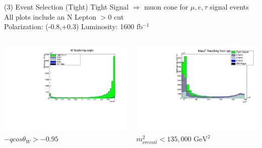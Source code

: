 \documentclass[10pt]{beamer}
\begin{document}
\begin{frame}{(3) Event Selection (Tight)}
\scriptsize
Tight Signal $\Rightarrow$  muon cone for $\mu,e,\tau$ signal events\\
All plots include an N Lepton $> 0$ cut\\
Polarization: (-0.8,+0.3)\quad
Luminosity: 1600 fb$^{-1}$\\
\begin{columns}
\begin{column}{0.5\textwidth}
\includegraphics[scale=0.3, left]{qcostHist.pdf} \\
$-qcos\theta_W > -0.95$
\end{column}
\begin{column}{0.5\textwidth}
\includegraphics[scale=0.3, left]{vrecoilHist.pdf} \\
$m^2_{\nu recoil} < 135,000 \, \, \text{GeV}^2$
\end{column}
\end{columns}
\end{frame}
\end{document}
